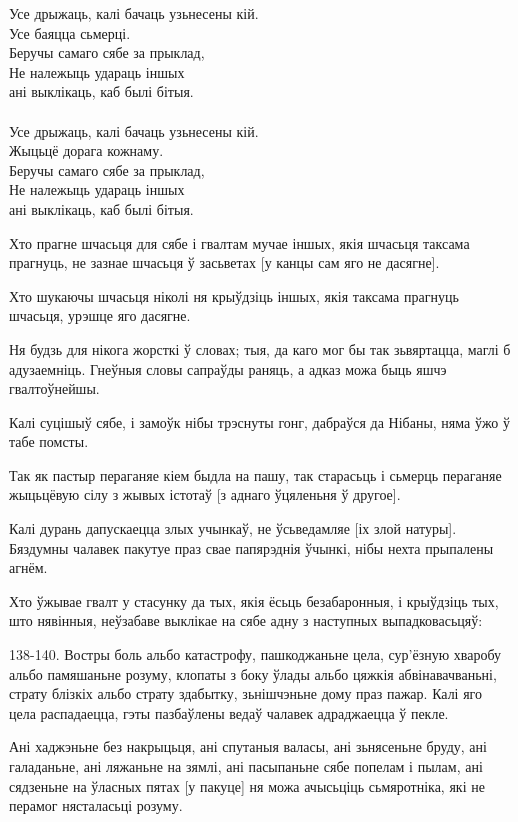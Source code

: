 \documentclass{article}
\begin{document}
Усе дрыжаць, калі бачаць узьнесены кій.\\
Усе баяцца сьмерці.\\
Беручы самаго сябе за прыклад,\\
Не належыць удараць іншых\\
ані выклікаць, каб былі бітыя.\\
~\\
Усе дрыжаць, калі бачаць узьнесены кій.\\
Жыцьцё дорага кожнаму.\\
Беручы самаго сябе за прыклад,\\
Не належыць удараць іншых\\
ані выклікаць, каб былі бітыя.

Хто прагне шчасьця для сябе і гвалтам мучае іншых, якія шчасьця
таксама прагнуць, не зазнае шчасьця ў засьветах {[}у канцы сам яго не
дасягне{]}.

Хто шукаючы шчасьця ніколі ня крыўдзіць іншых, якія таксама
прагнуць шчасьця, урэшце яго дасягне.

Ня будзь для нікога жорсткі ў словах; тыя, да каго мог бы так
зьвяртацца, маглі б адузаемніць. Гнеўныя словы сапраўды раняць, а адказ
можа быць яшчэ гвалтоўнейшы.

Калі суцішыў сябе, і замоўк нібы трэснуты гонг, дабраўся да Нібаны,
няма ўжо ў табе помсты.

Так як пастыр пераганяе кіем быдла на пашу, так старасьць і сьмерць
пераганяе жыцьцёвую сілу з жывых істотаў {[}з аднаго ўцяленьня ў
другое{]}.

Калі дурань дапускаецца злых учынкаў, не ўсьведамляе {[}іх злой
натуры{]}. Бяздумны чалавек пакутуе праз свае папярэднія ўчынкі, нібы
нехта прыпалены агнём.

Хто ўжывае гвалт у стасунку да тых, якія ёсьць безабаронныя, і
крыўдзіць тых, што нявінныя, неўзабаве выклікае на сябе адну з наступных
выпадковасьцяў:

138-140. Востры боль альбо катастрофу, пашкоджаньне цела, сур'ёзную
хваробу альбо памяшаньне розуму, клопаты з боку ўлады альбо цяжкія
абвінавачваньні, страту блізкіх альбо страту здабытку, зьнішчэньне дому
праз пажар. Калі яго цела распадаецца, гэты пазбаўлены ведаў чалавек
адраджаецца ў пекле.

Ані хаджэньне без накрыцьця, ані спутаныя валасы, ані зьнясеньне
бруду, ані галаданьне, ані ляжаньне на зямлі, ані пасыпаньне сябе
попелам і пылам, ані сядзеньне на ўласных пятах {[}у пакуце{]} ня можа
ачысьціць сьмяротніка, які не перамог нясталасьці розуму.
\end{document}
